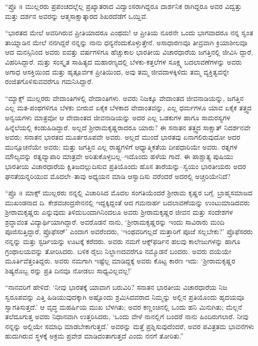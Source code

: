 “ಪ್ರೊ ॥ ಮುಲ್ಲರರು ಪ್ರಪಂಚದಲ್ಲೆಲ್ಲ ಪ್ರಖ್ಯಾತರಾದ ವಿದ್ವಾಂಸರಾಗಿದ್ದರೂ ದಾರ್ಶನಿಕ ರಾಗಿದ್ದರೂ ಅವರ ವಿದ್ವತ್ತು ಮತ್ತು ದರ್ಶನ ಅವರನ್ನು ಆತ್ಮಸಾಕ್ಷಾತ್ಕಾರದ ಶಿಖರದೆಡೆಗೆ ಒಯ್ದಿವೆ.

“ಭಾರತದ ಮೇಲೆ ಅವರಿಗಿರುವ ಪ್ರೀತಿಯಾದರೂ ಎಂಥದು! ಆ ಪ್ರೀತಿಯ ನೂರನೇ ಒಂದು ಭಾಗವಾದರೂ ನನ್ನ ಸ್ವಂತ ತಾಯ್ನಾಡಿನ ಮೇಲೆ ನನಗಿದ್ದರೆ ನನ್ನನ್ನು ನಾನು ಧನ್ಯನೆಂದುಕೊಳ್ಳುತ್ತೇನೆ. ಅಸಾಧಾರಣವೂ ತೀವ್ರವಾಗಿ ಕ್ರಿಯಾಶೀಲವೂ ಆದ ಮನಸ್ಸಿನಿಂದ ಅವರು ಐವತ್ತು ವರ್ಷಗಳಿಗೂ ಹೆಚ್ಚುಕಾಲ ಭಾರತೀಯ ವಿಚಾರಧಾರೆಯ ಜಗತ್ತಿನಲ್ಲಿ ಜೀವಿಸಿ ದ್ದಾರೆ, ವಿಹರಿಸಿದ್ದಾರೆ. ಮತ್ತು ಸಂಸ್ಕೃತ ಸಾಹಿತ್ಯದ ಮಹಾರಣ್ಯದಲ್ಲಿ ಬೆಳಕು-ಕತ್ತಲೆಗಳ ಸೂಕ್ಷ್ಮ ಬದಲಾವಣೆಗಳನ್ನು ಅವರು ಅಗಾಧ ಆಸಕ್ತಿಯಿಂದ ಮತ್ತು ಹೃತ್ಪೂರ್ವಕ ಪ್ರೀತಿಯಿಂದ, ಅವು ತಮ್ಮ ಜೀವದಾಳಕ್ಕಿಳಿದು ತಮ್ಮ ವ್ಯಕ್ತಿತ್ವವನ್ನೇ ರಂಜಿತಗೊಳಿಸುವವರೆಗೂ ಗಮನಿಸಿದ್ದಾರೆ.

“ಮ್ಯಾಕ್ಸ್ ಮುಲ್ಲರರು ವೇದಾಂತಿಗಳಲ್ಲಿ ವೇದಾಂತಿಗಳು. ಅವರು ನಿಜಕ್ಕೂ ವೇದಾಂತದ ಜೀವನಾಡಿಯನ್ನು, ಜಗತ್ತಿನ ಎಲ್ಲ ಮತ-ಪಂಥಗಳಿಗೂ ಬೆಳಕು ಬೀರುವ ಏಕೈಕ ಬೆಳಕಾದ ವೇದಾಂತವನ್ನು, ಎಲ್ಲ ಧರ್ಮಗಳೂ ಯಾವ ಏಕೈಕ ತತ್ತ್ವದ ಅನ್ವಯಗಳು ಮಾತ್ರವೋ ಆ ವೇದಾಂತದ ಜೀವನಾಡಿಯನ್ನು ಅದರ ಎಲ್ಲ ಒಡಕುಗಳ ಹಾಗೂ ಸಾಮರಸ್ಯಗಳ ಹಿನ್ನೆಲೆಯಲ್ಲಿ ಕಂಡುಹಿಡಿದ್ದಾರೆ. ಅಲ್ಲದೆ ಶ್ರೀರಾಮಕೃಷ್ಣರಾದರೂ ಯಾರು? ಈ ಸನಾತನ ತತ್ತ್ವದ ಸಾಕ್ಷಾತ್ ನಿದರ್ಶನವೇ ಅವರು; ಸನಾತನ ಭಾರತದ ಮೂರ್ತರೂಪವೇ ಅವರು. ಅಲ್ಲದೆ ಮುಂದೆ ಭಾರತವು ಏನಾಗಲಿರುವುದೋ ಅದರ ಮುನ್ಸೂಚನೆಯೇ ಅವರು; ಮತ್ತು ಜಗತ್ತಿನ ಎಲ್ಲ ರಾಷ್ಟ್ರಗಳಿಗೆ ಆಧ್ಯಾತ್ಮಿಕತೆಯ ದೀಪಧಾರಿಯೇ ಅವರು. ರತ್ನಗಳ ಮೌಲ್ಯವನ್ನು ರತ್ನವ್ಯಾಪಾರಿ ಮಾತ್ರವೇ ಅರಿತುಕೊಳ್ಳಬಲ್ಲ–ಇದೊಂದು ಹಳೆಯ ಗಾದೆ. ಈ ಪಾಶ್ಚಾತ್ಯ ಪುಷಿಯು ಭಾರತೀಯ ವಿಚಾರಧಾರೆಯ ಕ್ಷಿತಿಜದಲ್ಲುದಿಸುವ ಪ್ರತಿಯೊಂದು ಹೊಸ ತಾರೆಯನ್ನು–ಸ್ವಯಂ ಭಾರತೀಯರು ಅದರ ಘನತೆಯನ್ನರಿಯುವ ಮೊದಲೇ–ತಾವು ಅಧ್ಯಯನ ಮಾಡಿ ಆಸ್ವಾದಿಸು ವರೆಂದರೆ ಅದರಲ್ಲಿ ಅಚ್ಚರಿಯೇನಿದೆ?

“ಪ್ರೊ ॥ ಮಾಕ್ಸ್ ಮುಲ್ಲರರು ನನ್ನಲ್ಲಿ ವಿಚಾರಿಸಿದ ಮೊದಲ ಸಂಗತಿಯೆಂದರೆ ಶ್ರೀರಾಮ ಕೃಷ್ಣರ ಬಗ್ಗೆ. ಬ್ರಾಹ್ಮಸಮಾಜದ ಮುಖಂಡನಾದ ದಿ. ಕೇಶವಚಂದ್ರಸೇನನಲ್ಲಿ ಇದ್ದಕ್ಕಿದ್ದಂತೆ ಆದ ಗಮನಾರ್ಹ ಬದಲಾವಣೆಯನ್ನು ಉಂಟುಮಾಡಿದವರು ಶ್ರೀರಾಮಕೃಷ್ಣರು ಎನ್ನುವುದು ತಿಳಿದುಬಂದಾಗಿನಿಂದಲೂ ಅವರು ಶ್ರೀರಾಮಕೃಷ್ಣರ ಜೀವನ ಮತ್ತು ಸಂದೇಶಗಳ ಶ್ರದ್ಧಾವಂತ ವಿದ್ಯಾರ್ಥಿಯಾಗಿದ್ದಾರೆ. ಅವರೊಡನೆ ನಾನು, ‘ಶ್ರೀರಾಮಕೃಷ್ಣರನ್ನು ಇಂದು ಸಾವಿರಾರು ಮಂದಿ ಪೂಜಿಸುತ್ತಿದ್ದಾರೆ, ಪ್ರೊಫೆಸರ್​’ ಎಂದಾಗ ಅವರೆಂದರು, ‘ಇಂಥವರಿಗಲ್ಲದೆ ಮತ್ತಾರಿಗೆ ಪೂಜೆ ಸಲ್ಲಬೇಕು?’ ಪ್ರೊಫೆಸರರು ನನ್ನನ್ನು ಮತ್ತು ಸ್ಟರ್ಡಿಯನ್ನು ಊಟಕ್ಕೆ ಕರೆದರು. ಅವರು ನಮಗೆ ಆಕ್ಸ್​ಫರ್ಡಿನ ಹಲವು ಕಾಲೇಜುಗಳನ್ನು ಹಾಗೂ ಗ್ರಂಥಾಲಯವನ್ನು ತೋರಿಸಿದರು. ಬಳಿಕ ರೈಲು ನಿಲ್ದಾಣದವರೆಗೂ ನಮ್ಮೊಡನೆ ಬಂದರು. ಅವರು ದಯೆಯೇ ಮೂರ್ತಿವೆತ್ತಂತಿದ್ದರು. ಅವರು ನಮಗಾಗಿ ಇಷ್ಟೆಲ್ಲ ಮಾಡಿದ್ದಕ್ಕೆ ಅವರು ಕೊಟ್ಟ ಕಾರಣ ಇದು: ‘ಶ್ರೀರಾಮಕೃಷ್ಣರ ಶಿಷ್ಯರೊಬ್ಬ ರನ್ನು ಪ್ರತಿ ದಿನವೂ ನೋಡಲು ಸಾಧ್ಯವಿಲ್ಲವಲ್ಲ!’

“ನಾನವರಿಗೆ ಹೇಳಿದೆ: ‘ನೀವು ಭಾರತಕ್ಕೆ ಯಾವಾಗ ಬರುವಿರಿ? ಸನಾತನ ಭಾರತೀಯ ವಿಚಾರಧಾರೆಯ ನಿಜ ಸ್ವರೂಪವನ್ನು ಎತ್ತಿ ಹಿಡಿಯುವುದಕ್ಕಾಗಿ ಅಷ್ಟೊಂದು ಶ್ರಮಿಸಿದವರಾದ ನಿಮ್ಮನ್ನು ಅಲ್ಲಿನ ಪ್ರತಿಯೊಂದು ಹೃದಯವೂ ಸ್ವಾಗತಿಸುತ್ತದೆ.’ ಆ ವೃದ್ಧ ಮಹರ್ಷಿಯ ಮುಖ ಬೆಳಗಿತು; ಅವರ ಕಣ್ಣಂಚಿನಲ್ಲಿ ಒಂದು ಹನಿ ಮಿನುಗಿತು; ಮೆಲ್ಲನೆ ತಲೆದೂಗುತ್ತ ಅವರು ನಿಧಾನವಾಗಿ ಉತ್ತರಿಸಿದರು, ‘ಒಂದು ವೇಳೆ ನಾನಲ್ಲಿಗೆ ಬಂದರೆ ನಾನು ಹಿಂದಿರುಗಲಾರೆ. ನೀವು ನನ್ನನ್ನು ಅಲ್ಲಿಯೇ ಸಮಾಧಿ ಮಾಡಬೇಕಾಗುತ್ತದೆ.’ ಅವರನ್ನು ಮತ್ತೆ ಪ್ರಶ್ನಿಸುವುದೆಂದರೆ, ಅವರ ಪವಿತ್ರತಮ ಭಾವನೆಗಳು ಹುದುಗಿರುವ ಸ್ಥಳಕ್ಕೆ ಅಕ್ರಮ ಪ್ರವೇಶ ಮಾಡಿದಂತಾಗುತ್ತದೆ ಎಂದು ನನಗೆ ತೋರಿತು.”

